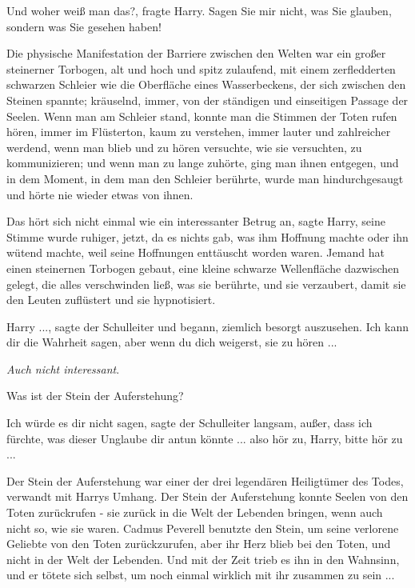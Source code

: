\glqq{}Und woher weiß man das?\grqq{}, fragte Harry. \glqq{}Sagen Sie mir nicht,
was Sie glauben, sondern was Sie gesehen haben!\grqq{}

Die physische Manifestation der Barriere zwischen den Welten war ein großer
steinerner Torbogen, alt und hoch und spitz zulaufend, mit einem zerfledderten
schwarzen Schleier wie die Oberfläche eines Wasserbeckens, der sich zwischen den
Steinen spannte; kräuselnd, immer, von der ständigen und einseitigen Passage der
Seelen. Wenn man am Schleier stand, konnte man die Stimmen der Toten rufen
hören, immer im Flüsterton, kaum zu verstehen, immer lauter und zahlreicher
werdend, wenn man blieb und zu hören versuchte, wie sie versuchten, zu
kommunizieren; und wenn man zu lange zuhörte, ging man ihnen entgegen, und in
dem Moment, in dem man den Schleier berührte, wurde man hindurchgesaugt und
hörte nie wieder etwas von ihnen.

\glqq{}Das hört sich nicht einmal wie ein interessanter Betrug an\grqq{}, sagte
Harry, seine Stimme wurde ruhiger, jetzt, da es nichts gab, was ihm Hoffnung
machte oder ihn wütend machte, weil seine Hoffnungen enttäuscht worden waren.
\glqq{}Jemand hat einen steinernen Torbogen gebaut, eine kleine schwarze
Wellenfläche dazwischen gelegt, die alles verschwinden ließ, was sie berührte,
und sie verzaubert, damit sie den Leuten zuflüstert und sie hypnotisiert.\grqq{}

\glqq{}Harry ...\grqq{}, sagte der Schulleiter und begann, ziemlich besorgt
auszusehen. \glqq{}Ich kann dir die Wahrheit sagen, aber wenn du dich weigerst,
sie zu hören ...\grqq{}

\emph{Auch nicht interessant}.

\glqq{}Was ist der Stein der Auferstehung?\grqq{}

\glqq{}Ich würde es dir nicht sagen\grqq{}, sagte der Schulleiter langsam, \glqq{}
außer, dass ich fürchte, was dieser Unglaube dir antun könnte ... also hör zu,
Harry, bitte hör zu ...\grqq{}

Der Stein der Auferstehung war einer der drei legendären Heiligtümer des Todes,
verwandt mit Harrys Umhang. Der Stein der Auferstehung konnte Seelen von den
Toten zurückrufen - sie zurück in die Welt der Lebenden bringen, wenn auch nicht
so, wie sie waren. Cadmus Peverell benutzte den Stein, um seine verlorene
Geliebte von den Toten zurückzurufen, aber ihr Herz blieb bei den Toten, und
nicht in der Welt der Lebenden. Und mit der Zeit trieb es ihn in den Wahnsinn,
und er tötete sich selbst, um noch einmal wirklich mit ihr zusammen zu sein ...


